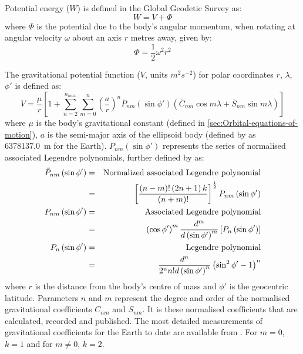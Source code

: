 Potential energy ($W$) is defined in the Global Geodetic Survey \parencite{WGS84} as:
\begin{equation}
W=V+\Phi\label{eq:Total-Grav-Potential}
\end{equation}
where $\Phi$ is the potential due to the body's angular momentum, when rotating at angular velocity $\omega$ about an axis $r$ metres away, given by:
\begin{equation}
\Phi=\frac{1}{2}\omega^{2}r^{2}\label{eq:Angular-Momentum}
\end{equation}


The gravitational potential function ($V$, units $m^{2}s^{-2}$) for polar coordinates $r$, $\lambda$, $\phi'$ is defined as:
\begin{equation}
V=\frac{\mu}{r}\left[1+\sum_{n=2}^{n_{max}}\sum_{m=0}^{n}\left(\frac{a}{r}\right)^{n}\bar{P}_{nm}\left(\sin\phi'\right)\left(\bar{C}_{nm}\cos m\lambda+\bar{S}_{nm}\sin m\lambda\right)\right]
\label{eq:Grav-Potential}
\end{equation}
where $\mu$ is the body's gravitational constant (defined in \autoref{sec:Orbital-equations-of-motion}), $a$ is the semi-major axis of the ellipsoid body (defined by \citeauthor{WGS84} as 6378137.0~m for the Earth). $\bar{P}_{nm}\left(\sin\phi'\right)$ represents the series of normalised associated Legendre polynomials, further defined by \textcite{WGS84}  as:
\begin{eqnarray}\notag
\bar{P}_{nm}\left(\sin\phi'\right) & = & \text{Normalized associated Legendre polynomial}\\
 & = & \left[\frac{\left(n-m\right)!\left(2n+1\right)k}{\left(n+m\right)!}\right]^{\frac{1}{2}}P_{nm}\left(\sin\phi'\right)\\\notag
P_{nm}\left(\sin\phi'\right) & = & \text{Associated Legendre polynomial}\\
 & = & \left(\cos\phi'\right)^{m}\frac{d^{m}}{d\left(\sin\phi'\right)^{m}}\left[P_{n}\left(\sin\phi'\right)\right]\\\notag
P_{n}\left(\sin\phi'\right) & = & \text{Legendre polynomial}\\
 & = & \frac{d^{n}}{2^{n}n!d\left(\sin\phi'\right)^{n}}\left(\sin^{2}\phi'-1\right)^{n}
\end{eqnarray}
where $r$ is the distance from the body's centre of mass and $\phi'$ is the geocentric latitude. Parameters $n$ and $m$ represent the degree and order of the normalised gravitational coefficients $C_{nm}$ and $S_{nm}$. It is these normalised coefficients that are calculated, recorded and published. The most detailed measurements of gravitational coefficients for the Earth to date are available from \textcite{EIGEN-5C}.  For $m = 0$, $k = 1$ and for $m \neq 0$, $k = 2$. 

